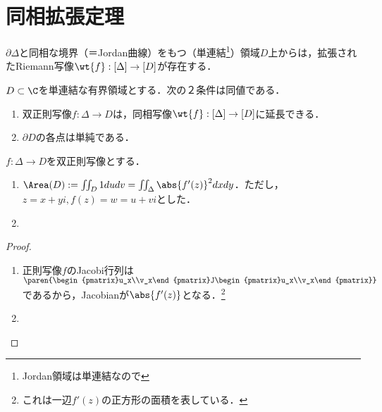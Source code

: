 \documentclass[uplatex, dvipdfmx]{jsreport}
\begin{document}
\section{同相拡張定理}

\begin{tcolorbox}[colframe=ForestGreen, colback=ForestGreen!10!white,breakable,colbacktitle=ForestGreen!40!white,coltitle=black,fonttitle=\bfseries\sffamily,
title=]
    $\partial\Delta$と同相な境界（＝Jordan曲線）をもつ（単連結\footnote{Jordan領域は単連結なので}）領域$D$上からは，拡張されたRiemann写像$\wt{f}:[\Delta]\to[D]$が存在する．
\end{tcolorbox}

\begin{theorem}
    $D\subset\C$を単連結な有界領域とする．次の２条件は同値である．
    \begin{enumerate}
        \item 双正則写像$f:\Delta\to D$は，同相写像$\wt{f}:[\Delta]\to[D]$に延長できる．
        \item $\partial D$の各点は単純である．
    \end{enumerate}
\end{theorem}

\begin{lemma}
    $f:\Delta\to D$を双正則写像とする．
    \begin{enumerate}
        \item $\Area(D):=\iint_D1dudv=\iint_\Delta\abs{f'(z)}^2dxdy$．ただし，$z=x+yi,f(z)=w=u+vi$とした．
        \item 
    \end{enumerate}
\end{lemma}
\begin{proof}\mbox{}
    \begin{enumerate}
        \item 正則写像$f$のJacobi行列は$\paren{\begin{pmatrix}u_x\\v_x\end{pmatrix}J\begin{pmatrix}u_x\\v_x\end{pmatrix}}$であるから，Jacobianが$\abs{f'(z)}$となる．\footnote{これは一辺$f'(z)$の正方形の面積を表している．}
        \item 

    \end{enumerate}
\end{proof}
\end{document}
